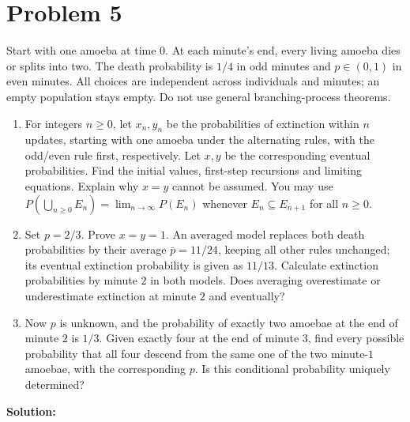 \documentclass[11pt,a4paper]{article}
\newcommand{\Prob}{P}
\begin{document}
\clearpage
\section*{Problem 5}
Start with one amoeba at time $0$. At each minute's end, every living
amoeba dies or splits into two. The death probability is $1/4$ in odd
minutes and $p\in(0,1)$ in even minutes. All choices are independent
across individuals and minutes; an empty population stays empty.
Do not use general branching-process theorems.

\begin{enumerate}
\item For integers $n\geq0$, let $x_n,y_n$ be the probabilities of
extinction within $n$ updates, starting with one amoeba under the
alternating rules, with the odd/even rule first, respectively. Let $x,y$ be the corresponding
eventual probabilities. Find the initial values, first-step recursions
and limiting equations. Explain why $x=y$ cannot be assumed.
You may use \mbox{$\Prob(\bigcup_{n\geq0}E_n)=\lim_{n\to\infty}\Prob(E_n)$}
whenever $E_n\subseteq E_{n+1}$ for all $n\geq0$.

\item Set $p=2/3$. Prove $x=y=1$. An averaged model replaces both
death probabilities by their average $\bar p=11/24$, keeping all other rules unchanged;
its eventual extinction probability is given as $11/13$.
Calculate extinction probabilities by minute $2$ in both models.
Does averaging overestimate or underestimate extinction at minute $2$
and eventually?

\item Now $p$ is unknown, and the probability of exactly two amoebae
at the end of minute $2$ is $1/3$. Given exactly four at the end of
minute $3$, find every possible probability that all four descend
from the same one of the two minute-$1$ amoebae, with the corresponding
$p$. Is this conditional probability uniquely determined?
\end{enumerate}

\textbf{Solution:}
\end{document}
